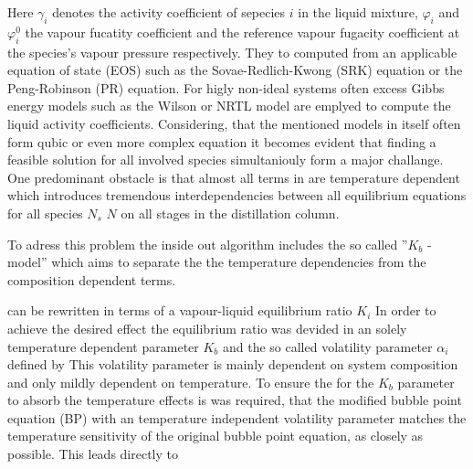Here $\gamma_i$ denotes the activity coefficient of sepecies $i$ in the liquid mixture, 
$\varphi_i$ and $\varphi_i^0$ the vapour fucatity coefficient and the reference vapour
fugacity coefficient at the species's vapour pressure respectively. 
They to computed from an applicable equation of state (EOS) such as the Sovae-Redlich-Kwong (SRK)
equation or the Peng-Robinson (PR) equation. For higly non-ideal systems often excess Gibbs 
energy models such as the Wilson or NRTL model are emplyed to compute the liquid 
activity coefficients. Considering, that the mentioned models in itself often form qubic 
or even more complex equation it becomes evident that finding a feasible solution for 
all involved species simultaniouly form a major challange. One predominant obstacle is 
that almost all terms in are temperature dependent which introduces tremendous interdependencies
between all equilibrium equations for all species $N_s$ $N$ on all stages in the distillation column. 

To adress this problem the inside out algorithm includes the so called ''$K_b$ - model'' 
which aims to separate the the temperature dependencies from the composition dependent terms. 

 can be rewritten in terms of a vapour-liquid equilibrium ratio $K_i$
In order to achieve the desired effect the equilibrium ratio was devided in an solely temperature
dependent parameter $K_b$ and the so called volatility parameter $\alpha_i$ defined by
This volatility parameter is mainly dependent on system composition and only mildly dependent 
on temperature. To ensure the for the $K_b$ parameter to absorb the temperature effects is
was required, that the modified bubble point equation (BP) with an temperature independent 
volatility parameter 
matches the temperature sensitivity of the original bubble point equation, 
as closely as possible. This leads directly to \cite{Boston.1974}

